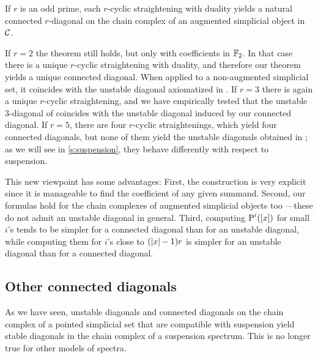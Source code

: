 \begin{theorem}\label{thm:main}
	If $r$ is an odd prime, each $r$-cyclic straightening with duality yields a natural connected $r$-diagonal on the chain complex of an augmented simplicial object in $\mathcal{C}$.
\end{theorem}

If $r=2$ the theorem still holds, but only with coefficients in $\mathbb{F}_2$.
In that case there is a unique $r$-cyclic straightening with duality, and therefore our theorem yields a unique connected diagonal.
When applied to a non-augmented simplicial set, it coincides with the unstable diagonal axiomatized in \cite{medina2022axiomatic}.
If $r = 3$ there is again a unique $r$-cyclic straightening, and we have empirically tested that the unstable $3$-diagonal of \cite{medina2021may_st} coincides with the unstable diagonal induced by our connected diagonal.
If $r = 5$, there are four $r$-cyclic straightenings, which yield four connected diagonals, but none of them yield the unstable diagonals obtained in \cite{medina2021may_st}; as we will see in \cref{s:suspension}, they behave differently with respect to suspension.

This new viewpoint has some advantages:
First, the construction is very explicit since it is manageable to find the coefficient of any given summand. Second, our formulas hold for the chain complexes of augmented simplicial objects too ---these do not admit an unstable diagonal in general.
Third, computing $\operatorname{P}^i([x])$ for small $i$'s tends to be simpler for a connected diagonal than for an unstable diagonal, while computing them for $i$'s close to $(\lvert x\rvert-1)r$ is simpler for an unstable diagonal than for a connected diagonal.

\subsection{Other connected diagonals}


As we have seen, unstable diagonals and connected diagonals on the chain complex of a pointed simplicial set that are compatible with suspension yield stable diagonals in the chain complex of a suspension spectrum. This is no longer true for other models of spectra.

